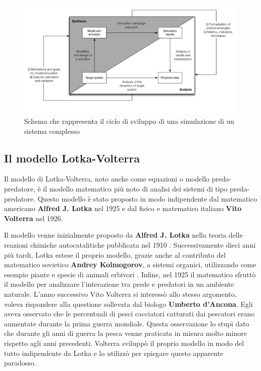 \documentclass[11pt]{article}
\begin{document}
\begin{figure}
    \centering
    \includegraphics[scale = 0.6]{cicloSviluppoSimulazione.png}
    \caption{Schema che rappresenta il ciclo di sviluppo di una simulazione di un sistema complesso}
    \label{figCicloSviluppo}
\end{figure}

\subsection{Il modello Lotka-Volterra}
\label{sec:LV}
Il modello di Lotka-Volterra, noto anche come equazioni o modello preda-predatore, è il modello matematico più noto di analisi dei sistemi di tipo preda-predatore. Questo modello è stato proposto in modo indipendente dal matematico americano \textbf{Alfred J. Lotka} nel 1925 e dal fisico e matematico italiano \textbf{Vito Volterra} nel 1926. 

Il modello venne inizialmente proposto da \textbf{Alfred J. Lotka} nella teoria delle reazioni chimiche autocatalitiche pubblicata nel 1910 \cite{Goel}. Successivamente dieci anni più tardi, Lotka estese il proprio modello, grazie anche al contributo del matematico sovietico \textbf{Andrey Kolmogorov}, a sistemi organici, utilizzando come esempio piante e specie di animali erbivori \cite{Lotka1920}. Infine, nel 1925 il matematico sfruttò il modello per analizzare l'interazione tra prede e predatori in un ambiente naturale\cite{Lotka1925}. L'anno successivo Vito Volterra si interessò allo stesso argomento, voleva rispondere alla questione sollevata dal biologo \textbf{Umberto d'Ancona}\cite{Bacaer}. Egli aveva osservato che le percentuali di pesci cacciatori catturati dai pescatori erano aumentate durante la prima guerra mondiale. Questa osservazione lo stupì dato che durante gli anni di guerra la pesca venne praticata in misura molto minore rispetto agli anni precedenti. Volterra sviluppò il proprio modello in modo del tutto indipendente da Lotka e lo utilizzò per spiegare questo apparente paradosso. 
\end{document}
